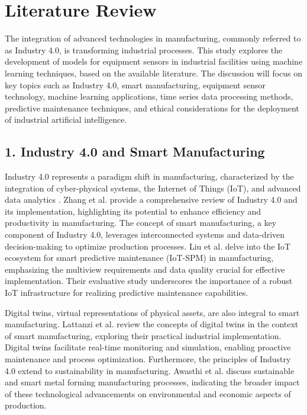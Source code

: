 \chapter{Literature Review}
\label{chap:literature}
\setlength{\parskip}{1em}

The integration of advanced technologies in manufacturing, commonly referred to as Industry 4.0, is transforming industrial processes. This study explores the development of models for equipment sensors in industrial facilities using machine learning techniques, based on the available literature.
The discussion will focus on key topics such as Industry 4.0, smart manufacturing, equipment sensor technology, machine learning applications, time series data processing methods, predictive maintenance techniques, and ethical considerations for the deployment of industrial artificial intelligence.

\section*{1. Industry 4.0 and Smart Manufacturing}

Industry 4.0 represents a paradigm shift in manufacturing, characterized by the integration of cyber-physical systems, the Internet of Things (IoT), and advanced data analytics \cite{zhang-2021}. Zhang et al. \cite{zhang-2021} provide a comprehensive review of Industry 4.0 and its implementation, highlighting its potential to enhance efficiency and productivity in manufacturing.  The concept of smart manufacturing, a key component of Industry 4.0, leverages interconnected systems and data-driven decision-making to optimize production processes. Liu et al. \cite{liu-2023} delve into the IoT ecosystem for smart predictive maintenance (IoT-SPM) in manufacturing, emphasizing the multiview requirements and data quality crucial for effective implementation. Their evaluative study underscores the importance of a robust IoT infrastructure for realizing predictive maintenance capabilities.

Digital twins, virtual representations of physical assets, are also integral to smart manufacturing. Lattanzi et al. \cite{lattanzi-2021} review the concepts of digital twins in the context of smart manufacturing, exploring their practical industrial implementation. Digital twins facilitate real-time monitoring and simulation, enabling proactive maintenance and process optimization. Furthermore, the principles of Industry 4.0 extend to sustainability in manufacturing. Awasthi et al. \cite{awasthi-2021} discuss sustainable and smart metal forming manufacturing processes, indicating the broader impact of these technological advancements on environmental and economic aspects of production.

